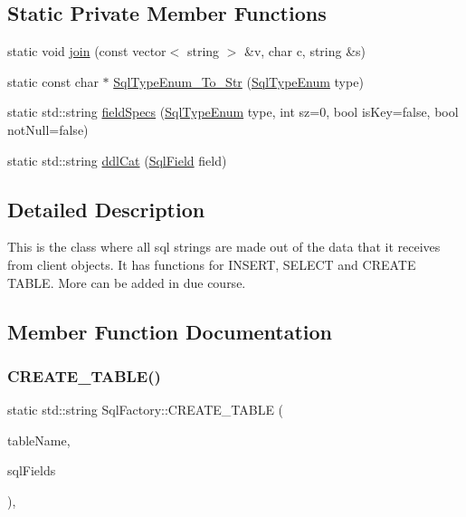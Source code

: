\subsection*{Static Private Member Functions}
\begin{DoxyCompactItemize}
\item 
static void \mbox{\hyperlink{classSqlFactory_a1ce0da51370f2723f3ca34f40c3ae9ea}{join}} (const vector$<$ string $>$ \&v, char c, string \&s)
\item 
static const char $\ast$ \mbox{\hyperlink{classSqlFactory_a760a8ef85d6503d858b174363c909f00}{Sql\+Type\+Enum\+\_\+\+To\+\_\+\+Str}} (\mbox{\hyperlink{datadefinition_8h_ad06ef517a8bb3398f146f81f18988b9f}{Sql\+Type\+Enum}} type)
\item 
static std\+::string \mbox{\hyperlink{classSqlFactory_a4bf8f30773341eba53e287bd6c2ef4c6}{field\+Specs}} (\mbox{\hyperlink{datadefinition_8h_ad06ef517a8bb3398f146f81f18988b9f}{Sql\+Type\+Enum}} type, int sz=0, bool is\+Key=false, bool not\+Null=false)
\item 
static std\+::string \mbox{\hyperlink{classSqlFactory_a28ad43892f8c9c7b207d8dced28e2ae2}{ddl\+Cat}} (\mbox{\hyperlink{structSqlField}{Sql\+Field}} field)
\end{DoxyCompactItemize}


\subsection{Detailed Description}
This is the class where all sql strings are made out of the data that it receives from client objects. It has functions for I\+N\+S\+E\+RT, S\+E\+L\+E\+CT and C\+R\+E\+A\+TE T\+A\+B\+LE. More can be added in due course. 

\subsection{Member Function Documentation}
\mbox{\label{classSqlFactory_a0500a06f7e113a0921eec11e2d39ce80}} 
\subsubsection{\texorpdfstring{C\+R\+E\+A\+T\+E\+\_\+\+T\+A\+B\+L\+E()}{CREATE\_TABLE()}}
{\footnotesize\ttfamily static std\+::string Sql\+Factory\+::\+C\+R\+E\+A\+T\+E\+\_\+\+T\+A\+B\+LE (\begin{DoxyParamCaption}\item[{const char $\ast$}]{table\+Name,  }\item[{vector$<$ \mbox{\hyperlink{structSqlField}{Sql\+Field}} $>$}]{sql\+Fields }\end{DoxyParamCaption})\hspace{0.3cm}{\ttfamily [inline]}, {\ttfamily [static]}}

